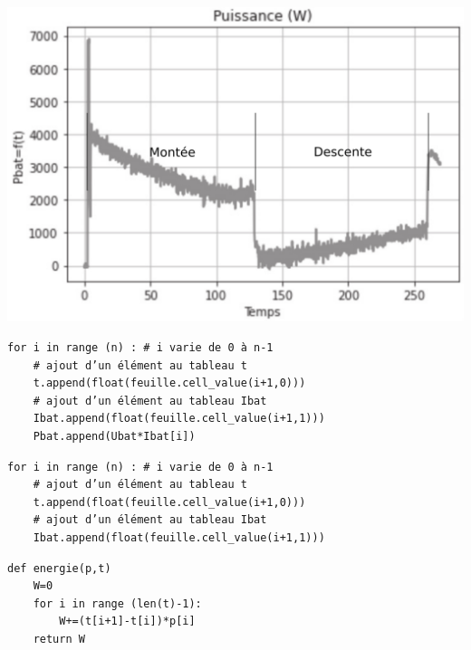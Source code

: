 {\begin{minipage}{0.45\linewidth}
\end{minipage}\hfill
\begin{minipage}{0.45\linewidth}
\centering\includegraphics[width=0.9\linewidth]{img/dr02b_cor}
\end{minipage}}



\ifprintcor
\begin{verbatim}
for i in range (n) : # i varie de 0 à n-1
	# ajout d’un élément au tableau t
	t.append(float(feuille.cell_value(i+1,0)))
	# ajout d’un élément au tableau Ibat
	Ibat.append(float(feuille.cell_value(i+1,1)))
	Pbat.append(Ubat*Ibat[i])
\end{verbatim}
\fi

\ifprintdr
\begin{verbatim}
for i in range (n) : # i varie de 0 à n-1
	# ajout d’un élément au tableau t
	t.append(float(feuille.cell_value(i+1,0)))
	# ajout d’un élément au tableau Ibat
	Ibat.append(float(feuille.cell_value(i+1,1)))

\end{verbatim}
\fi



\ifprintcor
\begin{verbatim}
def energie(p,t)
	W=0
	for i in range (len(t)-1):
		W+=(t[i+1]-t[i])*p[i]
	return W
\end{verbatim}
\fi


